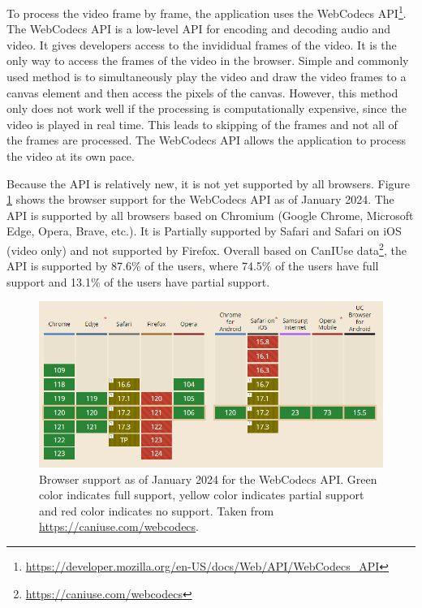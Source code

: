 To process the video frame by frame, the application uses the WebCodecs API\footnote{\url{https://developer.mozilla.org/en-US/docs/Web/API/WebCodecs_API}}. The WebCodecs API is a low-level API for encoding and decoding audio and video. It gives developers access to the invididual frames of the video. It is the only way to access the frames of the video in the browser. Simple and commonly used method is to simultaneously play the video and draw the video  frames to a canvas element and then access the pixels of the canvas. However, this method only does not work well if the processing is computationally expensive, since the video is played in real time. This leads to skipping of the frames and not all of the frames are processed. The WebCodecs API allows the application to process the video at its own pace.

Because the API is relatively new, it is not yet supported by all browsers. Figure \ref{fig:caniuseWebcodecs} shows the browser support for the WebCodecs API as of January 2024. The API is supported by all browsers based on Chromium (Google Chrome, Microsoft Edge, Opera, Brave, etc.). It is Partially supported by Safari and Safari on iOS (video only) and not supported by Firefox. Overall based on CanIUse data\footnote{\url{https://caniuse.com/webcodecs}}, the API is supported by 87.6\% of the users, where 74.5\% of the users have full support and 13.1\% of the users have partial support.


\begin{figure}[htbp]
    \centering
    \includegraphics[width=\textwidth]{obrazky-figures/caniuseWebcodecs.png}
    \caption{Browser support as of January 2024 for the WebCodecs API. Green color indicates full support, yellow color indicates partial support and red color indicates no support. Taken from \url{https://caniuse.com/webcodecs}.}
    \label{fig:caniuseWebcodecs}
\end{figure}

